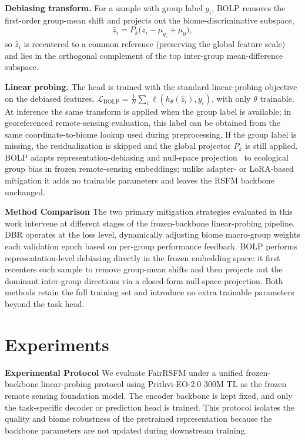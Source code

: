 \documentclass[10pt,twocolumn,letterpaper]{article}
\newcommand{\method}{FairRSFM\xspace}
\begin{document}
\textbf{Debiasing transform.} For a sample with group label $g_i$, BOLP removes the first-order group-mean shift and projects out the biome-discriminative subspace,
\begin{equation}
\hat{z}_i=P_k\big(z_i-\mu_{g_i}+\mu_0\big),
\end{equation}
so $\hat{z}_i$ is recentered to a common reference (preserving the global feature scale) and lies in the orthogonal complement of the top inter-group mean-difference subspace.

\textbf{Linear probing.} The head is trained with the standard linear-probing objective on the debiased features, $\mathcal{L}_{\mathrm{BOLP}}=\frac{1}{N}\sum_{i}\ell(h_\theta(\hat{z}_i),y_i)$, with only $\theta$ trainable. At inference the same transform is applied when the group label is available; in georeferenced remote-sensing evaluation, this label can be obtained from the same coordinate-to-biome lookup used during preprocessing. If the group label is missing, the residualization is skipped and the global projector $P_k$ is still applied. BOLP adapts representation-debiasing and null-space projection~\cite{bolukbasi2016man,ravfogel2020null} to ecological group bias in frozen remote-sensing embeddings; unlike adapter- or LoRA-based mitigation it adds no trainable parameters and leaves the RSFM backbone unchanged.

\smallskip
\noindent\textbf{Method Comparison}
The two primary mitigation strategies evaluated in this work intervene at different stages of the frozen-backbone linear-probing pipeline. DBR operates at the loss level, dynamically adjusting biome macro-group weights each validation epoch based on per-group performance feedback. BOLP performs representation-level debiasing directly in the frozen embedding space: it first recenters each sample to remove group-mean shifts and then projects out the dominant inter-group directions via a closed-form null-space projection. Both methods retain the full training set and introduce no extra trainable parameters beyond the task head.



\section{Experiments}

\noindent \textbf{Experimental Protocol}
We evaluate \method under a unified frozen-backbone linear-probing protocol using Prithvi-EO-2.0 300M TL as the frozen remote sensing foundation model. The encoder backbone is kept fixed, and only the task-specific decoder or prediction head is trained. This protocol isolates the quality and biome robustness of the pretrained representation because the backbone parameters are not updated during downstream training.
\end{document}
